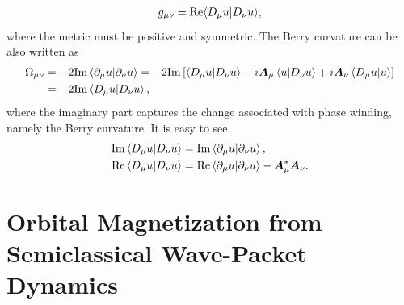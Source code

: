 \documentclass[12pt, oneside]{article}
\newcommand{\pa}{\partial}
\newcommand{\mr}[1]{\mathrm{#1}}
\newcommand{\bb}[1]{\left[#1\right]}
\numberwithin{equation}{subsection}
\begin{document}
\begin{align}
	g_{\mu \nu} = \mr{Re} {\braket{D_\mu u | D_\nu u}},
\end{align}
where the metric must be positive and symmetric. The Berry curvature can be also written as
\begin{align}
	\begin{split}
		\Omega_{\mu \nu} & = - 2 \mr{Im} \braket{\pa_\mu u | \pa_\nu u} = - 2 \mr{Im} \bb{\braket{D_\mu u | D_\nu u} - i \bm{A}_\mu \braket{u | D_\nu u} + i \bm{A}_\nu \braket{D_\mu u | u}} \\
		& = - 2 \mr{Im} \braket{D_\mu u | D_\nu u},
	\end{split}
\end{align}	
where the imaginary part captures the change associated with phase winding, namely the Berry curvature. It is easy to see
\begin{align}
    \begin{split}
		\mr{Im}  \braket{D_\mu u | D_\nu u} & =  \mr{Im} \braket{\pa_\mu u | \pa_\nu u}, \\
		\mr{Re}  \braket{D_\mu u | D_\nu u} & =  \mr{Re} \braket{\pa_\mu u | \pa_\nu u} - \bm{A}^{*}_\mu \bm{A}_\nu.
	\end{split}
\end{align}

\section{Orbital Magnetization from Semiclassical Wave-Packet Dynamics}
\end{document}
